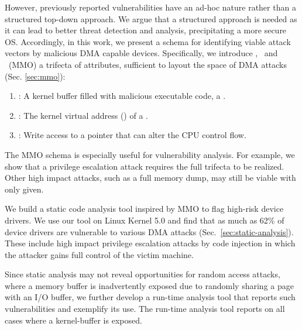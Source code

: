 However, previously reported vulnerabilities have an ad-hoc nature \cite{thunder,MMT16,Ben17b} rather than a structured top-down approach. We argue that a structured approach is needed as it can lead to better threat detection and analysis, precipitating a more secure OS. Accordingly, in this work, we present a schema for identifying viable attack vectors by malicious DMA capable devices. Specifically, we introduce \means,~\motivation{} and \oportunity~(MMO) a trifecta of attributes, sufficient to layout the space of DMA attacks (Sec. \ref{sec:mmo}):
\begin{enumerate}
    \item \motivation: A kernel buffer filled with malicious executable code, a \mabaf.
    \item \means: The kernel virtual address (\kva) of a \mabaf.
    \item \oportunity: Write access to a pointer that can alter the CPU control flow.
\end{enumerate} 

The MMO schema is especially useful for vulnerability analysis. For example, we show that a privilege escalation attack requires the full trifecta to be realized. Other high impact attacks, such as a full memory dump, may still be viable with only \oportunity{} given. 

We build a static code analysis tool inspired by MMO to flag high-risk device drivers. 
We use our tool on Linux Kernel 5.0 and find that as much as 62\% of device drivers are vulnerable to various DMA attacks (Sec.~\ref{sec:static-analysis}). 
These include high impact privilege escalation attacks by code injection in which the attacker gains full control of the victim machine.


Since static analysis may not reveal opportunities for random access attacks, where a memory buffer is inadvertently exposed due to randomly sharing a page with an I/O buffer, we further develop a run-time analysis tool that reports such vulnerabilities and exemplify its use. The run-time analysis tool reports on all cases where a kernel-buffer is exposed. 

